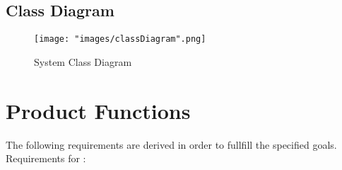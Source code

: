 \subsection{Class Diagram}
\begin{figure}[H]
\begin{center}
\texttt{[image: "images/classDiagram".png]}
\caption{System Class Diagram}
\end{center}
\end{figure}

\section{Product Functions}

The following requirements are derived in order to fullfill the specified goals.
\\


Requirements for :

